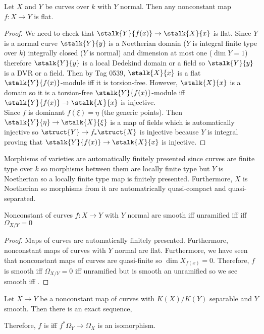 \documentclass[12pt]{article}
\begin{document}
\begin{prop}
Let $X$ and $Y$ be curves over $k$ with $Y$ normal. Then any nonconstant map $f : X \to Y$ is flat.
\end{prop}

\begin{proof}
We need to check that $\stalk{Y}{f(x)} \to \stalk{X}{x}$ is flat. Since $Y$ is a normal curve $\stalk{Y}{y}$ is a Noetherian domain ($Y$ is integral finite type over $k$) integrally closed ($Y$ is normal) and dimension at most one ($\dim{Y} = 1$) therefore $\stalk{Y}{y}$ is a local Dedekind domain or a field so $\stalk{Y}{y}$ is a DVR or a field. Then by Tag 0539, $\stalk{X}{x}$ is a flat $\stalk{Y}{f(x)}$-module iff it is torsion-free. However, $\stalk{X}{x}$ is a domain so it is a torsion-free $\stalk{Y}{f(x)}$-module iff $\stalk{Y}{f(x)} \to \stalk{X}{x}$ is injective.
\bigskip\\
Since $f$ is dominant $f(\xi) = \eta$ (the generic points). Then $\stalk{Y}{\eta} \to \stalk{X}{\xi}$ is a map of fields which is automatically injective so $\struct{Y} \to f_* \struct{X}$ is injective because $Y$ is integral proving that $\stalk{Y}{f(x)} \to \stalk{X}{x}$ is injective. 
\end{proof}

\begin{rmk}
Morphisms of varieties are automatically finitely presented since curves are finite type over $k$ so morphisms between them are locally finite type but $Y$ is Noetherian so a locally finite type map is finitely presented. Furthermore, $X$ is Noetherian so morphisms from it are automatrically quasi-compact and quasi-separated.
\end{rmk}

\begin{prop}
Nonconstant of curves $f : X \to Y$ with $Y$ normal are smooth iff unramified iff \etale iff $\Omega_{X/Y} = 0$
\end{prop}

\begin{proof}
Maps of curves are automatically finitely presented. Furthermore, nonconstant maps of curves with $Y$ normal are flat. Furthermore, we have seen that nonconstant maps of curves are quasi-finite so $\dim{X_{f(x)}} = 0$. Therefore, $f$ is smooth iff $\Omega_{X/Y} = 0$ iff unramified but \etale is smooth an unramified so we see smooth iff \etale. 
\end{proof}

\begin{lemma}
Let $X \to Y$ be a nonconstant map of curves with $K(X) / K(Y)$ separable and $Y$ smooth. Then there is an exact sequence,
\begin{center}
\end{center}
Therefore, $f$ is \etale iff $f^* \Omega_Y \to \Omega_X$ is an isomorphism.
\end{lemma}
\end{document}
